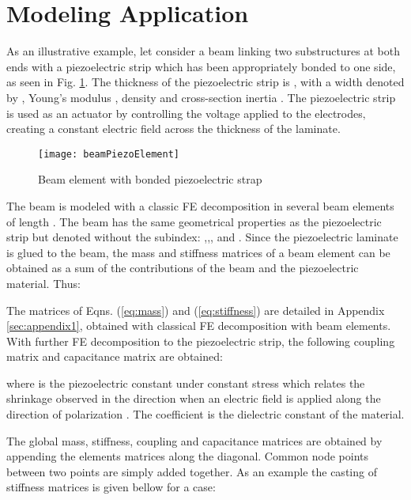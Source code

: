 \documentclass{ifacconf}
\begin{document}
\section{Modeling Application}
\label{sec:modeling}

As an illustrative example, let consider a beam linking two substructures at both ends with a piezoelectric strip which has been appropriately bonded to one side, as seen in Fig. \ref{fig:beamPiezoElement}. The thickness of the piezoelectric strip is , with a width denoted by , Young's modulus , density  and cross-section inertia . The piezoelectric strip is used
as an actuator by controlling the voltage  applied to the electrodes‚ creating a constant electric field  across the thickness of the laminate.

\begin{figure} 
\center
\texttt{[image: beamPiezoElement]}
\caption{Beam element with bonded piezoelectric strap }
\label{fig:beamPiezoElement}
\end{figure}

The beam is modeled with a classic FE decomposition in several beam elements of length . The beam has the same geometrical properties as the piezoelectric strip but denoted without the  subindex: ,,, and . Since the piezoelectric laminate is glued to the beam, the mass and stiffness matrices of a beam element can be obtained as a sum of the contributions of the beam and the piezoelectric material. Thus:





The matrices of Eqns. (\ref{eq:mass}) and (\ref{eq:stiffness}) are detailed in Appendix \ref{sec:appendix1}, obtained with classical FE decomposition with beam elements. With further FE decomposition to the piezoelectric strip, the following coupling matrix  and capacitance matrix are obtained:





where  is the piezoelectric constant under constant stress which relates the shrinkage observed in the direction  when an electric field  is applied along the direction of polarization . The coefficient  is the dielectric constant of the material. 

The global mass, stiffness, coupling and capacitance matrices are obtained by appending the elements matrices along the diagonal. Common node points between two points are simply added together. As an example the casting of stiffness matrices is given bellow for a  case:
\end{document}
